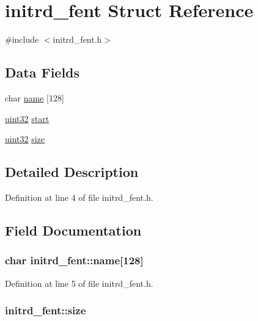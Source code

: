 \hypertarget{structinitrd__fent}{
\section{initrd\_\-fent Struct Reference}
\label{structinitrd__fent}
}


{\ttfamily \#include $<$initrd\_\-fent.h$>$}

\subsection*{Data Fields}
\begin{DoxyCompactItemize}
\item 
char \hyperlink{structinitrd__fent_aceece259a228b000098323df1ca831da}{name} \mbox{[}128\mbox{]}
\item 
\hyperlink{int__types_8h_a1134b580f8da4de94ca6b1de4d37975e}{uint32} \hyperlink{structinitrd__fent_a0585ff6c63fa0021b21046644256f213}{start}
\item 
\hyperlink{int__types_8h_a1134b580f8da4de94ca6b1de4d37975e}{uint32} \hyperlink{structinitrd__fent_a3bef07293d89012af9f3efdc6ef7e444}{size}
\end{DoxyCompactItemize}


\subsection{Detailed Description}


Definition at line 4 of file initrd\_\-fent.h.



\subsection{Field Documentation}
\hypertarget{structinitrd__fent_aceece259a228b000098323df1ca831da}{
\subsubsection[{name}]{\setlength{\rightskip}{0pt plus 5cm}char {\bf initrd\_\-fent::name}\mbox{[}128\mbox{]}}}
\label{structinitrd__fent_aceece259a228b000098323df1ca831da}


Definition at line 5 of file initrd\_\-fent.h.

\hypertarget{structinitrd__fent_a3bef07293d89012af9f3efdc6ef7e444}{
\subsubsection[{size}]{ {\bf initrd\_\-fent::size}}}
\label{structinitrd__fent_a3bef07293d89012af9f3efdc6ef7e444}


